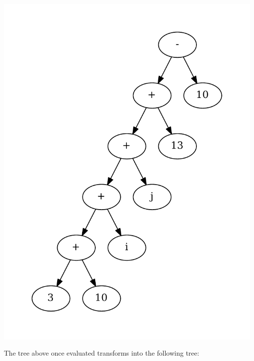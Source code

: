 \begin{center}
\includegraphics[scale=0.5]{graphs/evalTree.pdf}
\end{center}

The tree above once evaluated transforms into the following tree: 

